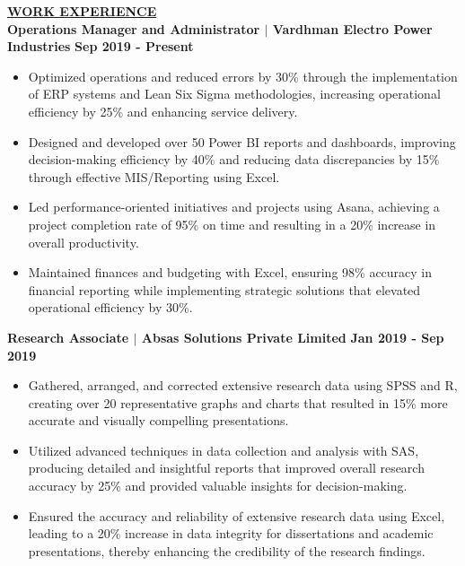 \documentclass{article}
\begin{document}
% 
%
\noindent \textbf{\underline{WORK EXPERIENCE}} \\
\noindent \textbf{Operations Manager and Administrator $\mid$ Vardhman Electro Power Industries} \hfill \textbf{Sep 2019 - Present}
\begin{itemize}[noitemsep,nolistsep,leftmargin=*]
    \item Optimized operations and reduced errors by 30\% through the implementation of ERP systems and Lean Six Sigma methodologies, increasing operational efficiency by 25\% and enhancing service delivery.
    \item Designed and developed over 50 Power BI reports and dashboards, improving decision-making efficiency by 40\% and reducing data discrepancies by 15\% through effective MIS/Reporting using Excel.
    \item Led performance-oriented initiatives and projects using Asana, achieving a project completion rate of 95\% on time and resulting in a 20\% increase in overall productivity.
    \item Maintained finances and budgeting with Excel, ensuring 98\% accuracy in financial reporting while implementing strategic solutions that elevated operational efficiency by 30\%.
\end{itemize}

\vspace{1mm}



\noindent \textbf{Research Associate $\mid$ Absas Solutions Private Limited} \hfill \textbf{Jan 2019 - Sep 2019}
\begin{itemize}[noitemsep,nolistsep,leftmargin=*]
    \item Gathered, arranged, and corrected extensive research data using SPSS and R, creating over 20 representative graphs and charts that resulted in 15\% more accurate and visually compelling presentations.
    \item Utilized advanced techniques in data collection and analysis with SAS, producing detailed and insightful reports that improved overall research accuracy by 25\% and provided valuable insights for decision-making.
    \item Ensured the accuracy and reliability of extensive research data using Excel, leading to a 20\% increase in data integrity for dissertations and academic presentations, thereby enhancing the credibility of the research findings.
\end{itemize}
\end{document}
